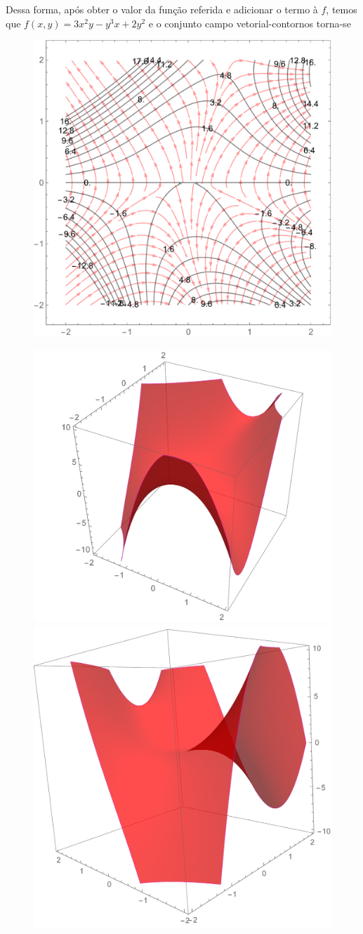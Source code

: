 \documentclass[a4paper, 12pt, brazilian]{article}
\begin{document}
	Dessa forma, após obter o valor da função referida e adicionar o termo à $f$, temos que $f(x,y)=3x^{2}y-y^{3}x+2y^{2}$ e o conjunto campo vetorial-contornos torna-se
	\begin{figure}[H]
		\centering
		\includegraphics[width=0.7\linewidth]{images/ex4}
		\label{fig:ex4}
	\end{figure}
	\begin{figure}[H]
		\centering
		\includegraphics[width=.5\linewidth]{images/ex4_3d1}
		\includegraphics[width=.4\linewidth]{images/ex4_3d2}
	\end{figure}
\end{document}
